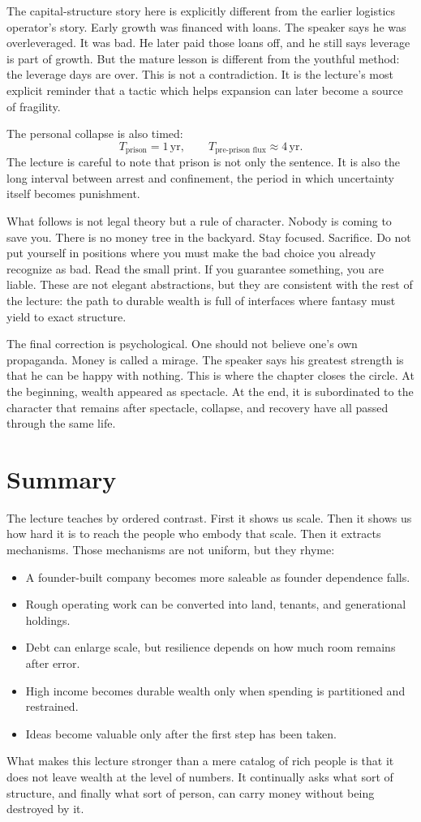 The capital-structure story here is explicitly different from the earlier logistics operator's story. Early growth was financed with loans. The speaker says he was overleveraged. It was bad. He later paid those loans off, and he still says leverage is part of growth. But the mature lesson is different from the youthful method: the leverage days are over. This is not a contradiction. It is the lecture's most explicit reminder that a tactic which helps expansion can later become a source of fragility.

The personal collapse is also timed:
\begin{equation}
T_{\text{prison}}=1\,\mathrm{yr},\qquad
T_{\text{pre-prison flux}}\approx 4\,\mathrm{yr}.
\end{equation}
The lecture is careful to note that prison is not only the sentence. It is also the long interval between arrest and confinement, the period in which uncertainty itself becomes punishment.

What follows is not legal theory but a rule of character. Nobody is coming to save you. There is no money tree in the backyard. Stay focused. Sacrifice. Do not put yourself in positions where you must make the bad choice you already recognize as bad. Read the small print. If you guarantee something, you are liable. These are not elegant abstractions, but they are consistent with the rest of the lecture: the path to durable wealth is full of interfaces where fantasy must yield to exact structure.

The final correction is psychological. One should not believe one's own propaganda. Money is called a mirage. The speaker says his greatest strength is that he can be happy with nothing. This is where the chapter closes the circle. At the beginning, wealth appeared as spectacle. At the end, it is subordinated to the character that remains after spectacle, collapse, and recovery have all passed through the same life.

\section{Summary}

The lecture teaches by ordered contrast. First it shows us scale. Then it shows us how hard it is to reach the people who embody that scale. Then it extracts mechanisms. Those mechanisms are not uniform, but they rhyme:

\begin{itemize}
\item A founder-built company becomes more saleable as founder dependence falls.
\item Rough operating work can be converted into land, tenants, and generational holdings.
\item Debt can enlarge scale, but resilience depends on how much room remains after error.
\item High income becomes durable wealth only when spending is partitioned and restrained.
\item Ideas become valuable only after the first step has been taken.
\end{itemize}

What makes this lecture stronger than a mere catalog of rich people is that it does not leave wealth at the level of numbers. It continually asks what sort of structure, and finally what sort of person, can carry money without being destroyed by it.